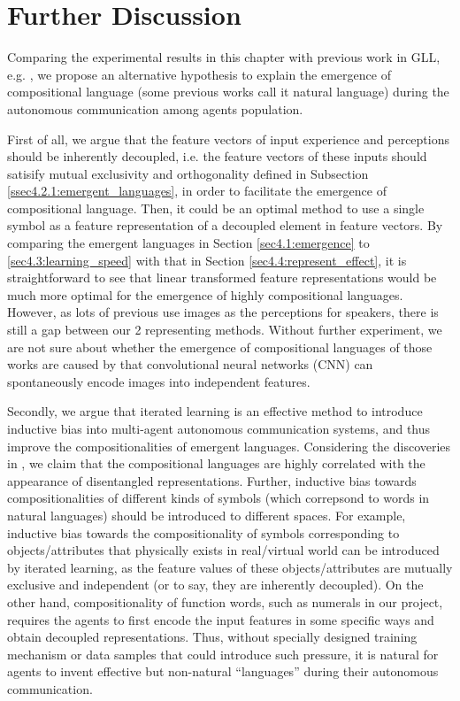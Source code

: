 \section{Further Discussion}
\label{sec4.5:discuss}

Comparing the experimental results in this chapter with previous work in GLL, e.g. \cite{kottur2017natural, hermann2017grounded, havrylov2017emergence, mordatch2018emergence}, we propose an alternative hypothesis to explain the emergence of compositional language (some previous works call it natural language) during the autonomous communication among agents population.

First of all, we argue that the feature vectors of input experience and perceptions should be inherently decoupled, i.e. the feature vectors of these inputs should satisify mutual exclusivity and orthogonality defined in Subsection \ref{ssec4.2.1:emergent_languages}, in order to facilitate the emergence of compositional language. Then, it could be an optimal method to use a single symbol as a feature representation of a decoupled element in feature vectors. By comparing the emergent languages in Section \ref{sec4.1:emergence} to \ref{sec4.3:learning_speed} with that in Section \ref{sec4.4:represent_effect}, it is straightforward to see that linear transformed feature representations would be much more optimal for the emergence of highly compositional languages. However, as lots of previous use images as the perceptions for speakers, there is still a gap between our 2 representing methods. Without further experiment, we are not sure about whether the emergence of compositional languages of those works are caused by that convolutional neural networks (CNN) can spontaneously encode images into independent features.

Secondly, we argue that iterated learning is an effective method to introduce inductive bias into multi-agent autonomous communication systems, and thus improve the compositionalities of emergent languages. Considering the discoveries in \cite{locatello2018challenging}, we claim that the compositional languages are highly correlated with the appearance of disentangled representations. Further, inductive bias towards compositionalities of different kinds of symbols (which correpsond to words in natural languages) should be introduced to different spaces. For example, inductive bias towards the compositionality of symbols corresponding to objects/attributes that physically exists in real/virtual world can be introduced by iterated learning, as the feature values of these objects/attributes are mutually exclusive and independent (or to say, they are inherently decoupled). On the other hand, compositionality of function words, such as numerals in our project, requires the agents to first encode the input features in some specific ways and obtain decoupled representations. Thus, without specially designed training mechanism or data samples that could introduce such pressure, it is natural for agents to invent effective but non-natural ``languages'' during their autonomous communication.